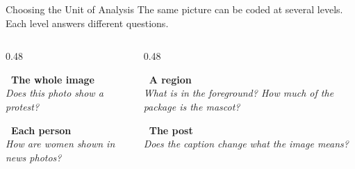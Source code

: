 \begin{frame}{Choosing the Unit of Analysis}
The same picture can be coded at several levels. Each level answers different questions.

\vspace{0.2cm}
\begin{columns}[T]
\begin{column}{0.48\textwidth}
\begin{greenbox}
\textbf{\faImage\ The whole image}\\
\emph{Does this photo show a protest?}
\end{greenbox}
\begin{greenbox}
\textbf{\faUser\ Each person}\\
\emph{How are women shown in news photos?}
\end{greenbox}
\end{column}
\begin{column}{0.48\textwidth}
\begin{greenbox}
\textbf{\faCrop\ A region}\\
\emph{What is in the foreground? How much of the package is the mascot?}
\end{greenbox}
\begin{greenbox}
\textbf{\faComments\ The post}\\
\emph{Does the caption change what the image means?}
\end{greenbox}
\end{column}
\end{columns}

\vspace{0.1cm}
\end{frame}

